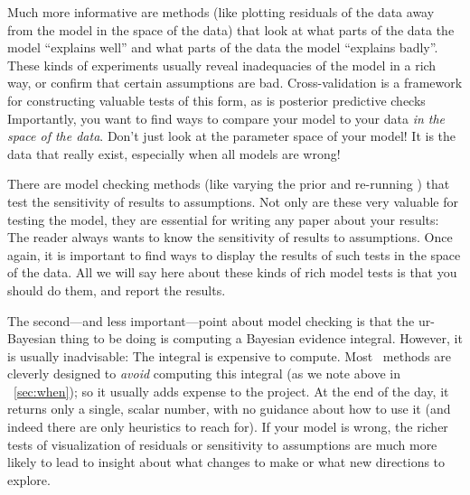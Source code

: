 \documentclass[modern]{aastex61}
\newcommand{\MCMC}{\acronym{MCMC}}
\begin{document}
Much more informative are methods (like plotting residuals of the data
away from the model in the space of the data) that look at what parts
of the data the model ``explains well'' and what parts of the data the
model ``explains badly''.
These kinds of experiments usually reveal inadequacies of the model in
a rich way, or confirm that certain assumptions are bad.
Cross-validation
is a framework for constructing
valuable tests of this form, as is posterior predictive checks
Importantly, you want to find ways to compare your model to your data
\emph{in the space of the data}.
Don't just look at the parameter space of your model!
It is the data that really exist, especially when all models are wrong!

There are model checking methods (like varying the prior and
re-running \MCMC) that test the sensitivity of results to assumptions.
Not only are these very valuable for testing the model, they are
essential for writing any paper about your results: The reader always
wants to know the sensitivity of results to assumptions.
Once again, it is important to find ways to display the results of
such tests in the space of the data.
All we will say here about these kinds of rich model tests is that you
should do them, and report the results.

The second---and less important---point about model checking is that
the ur-Bayesian thing to be doing is computing a Bayesian evidence
integral.
However, it is usually inadvisable:
The integral is expensive to compute.
Most \MCMC\ methods are cleverly designed to \emph{avoid} computing this
integral (as we note above in \sectionname~\ref{sec:when}); so it usually adds
expense to the project.
At the end of the day, it returns only a single, scalar number, with
no guidance about how to use it (and indeed there are only heuristics
to reach for).
If your model is wrong, the richer tests of visualization of residuals
or sensitivity to assumptions are much more likely to lead to insight
about what changes to make or what new directions to explore.

\end{document}
